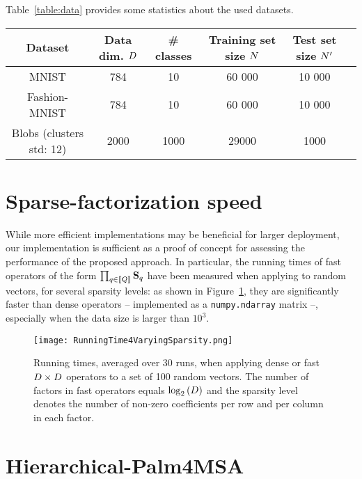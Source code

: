 Table~\ref{table:data} provides some statistics about the used datasets.

\begin{table*}[!h]
\centering
\begin{tabular}{|c|c|c|c|c|c|}
\hline
\textbf{Dataset} & \textbf{Data dim.} $D$        & \textbf{\# classes} & \textbf{Training set size} $N$ & \textbf{Test set size} $N'$ \\ \hline
MNIST                   & 784   & 10        & 60 000    & 10 000               \\ \hline
Fashion-MNIST           & 784   & 10        & 60 000    & 10 000               \\ \hline
Blobs (clusters std: 12)   & 2000  & 1000      & 29000      & 1000               \\ \hline
\end{tabular}
\caption{Datasets statistics}
\label{table:data}
\end{table*}

\section{Sparse-factorization speed}
\label{seq:sparse_factor_benchmarking}
While more efficient implementations may be beneficial for larger deployment, our implementation is sufficient as a proof of concept for assessing the performance of the proposed approach. 
In particular, the running times of fast operators of the form $\prod_{q\in\left \llbracket Q\right \rrbracket}{{\mathbf{S}}_q}$ have been measured when applying to random vectors, for several sparsity levels: 
as shown in Figure~\ref{fig:time_csr}, they are significantly faster than dense operators -- implemented as a \texttt{numpy.ndarray} matrix --, especially when the data size is larger than $10^3$.
\begin{figure}[tbh]
\centering
\texttt{[image: RunningTime4VaryingSparsity.png]}
\caption{Running times, averaged over 30 runs, when applying dense or fast $D \times D$ operators to a set of 100 random vectors. The number of factors in fast operators equals $\log_2\left (D\right )$ and the sparsity level denotes the number of non-zero coefficients per row and per column in each factor.}
\label{fig:time_csr}
\end{figure}

\section{Hierarchical-Palm4MSA}

